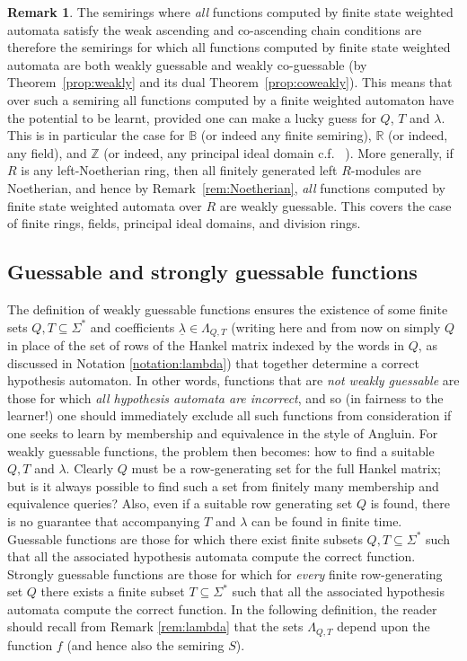 \documentclass[10pt,a4paper]{amsart}
\theoremstyle{definition}
\newtheorem{rem}[thm]{Remark}
\numberwithin{equation}{section}
\numberwithin{theorem}{section}
\begin{document}
\begin{rem}
\label{rem:fields2}
The semirings where \emph{all} functions computed by finite state weighted automata satisfy the weak ascending and co-ascending chain conditions are therefore the semirings for which all functions computed by finite state weighted automata are both weakly guessable and weakly co-guessable (by Theorem~\ref{prop:weakly} and its dual Theorem~\ref{prop:coweakly}). This means that over such a semiring all functions computed by a finite weighted automaton  have the potential to be learnt, provided one can make a lucky guess for $Q$, $T$ and $\lambda$. This is in particular the case for $\mathbb{B}$ (or indeed any finite semiring), $\mathbb{R}$ (or indeed, any field), and $\mathbb{Z}$  (or indeed, any principal ideal domain c.f. ~\cite{HKRS20}). More generally, if $R$ is any left-Noetherian ring, then all finitely generated left $R$-modules are Noetherian, and hence by Remark~\ref{rem:Noetherian}, \emph{all} functions computed by finite state weighted automata over $R$ are weakly guessable. This covers the case of finite rings, fields, principal ideal domains, and division rings.
\end{rem}


\subsection{Guessable and strongly guessable functions}

The definition of weakly guessable functions ensures the existence of some finite sets $Q,T \subseteq \Sigma^*$ and coefficients $\underline{\lambda} \in \Lambda_{Q,T}$ (writing here and from now on simply $Q$ in place of the set of rows of the Hankel matrix indexed by the words in $Q$, as discussed in Notation \ref{notation:lambda}) that together determine a correct hypothesis automaton. In other words, functions that are \emph{not weakly guessable} are those for which \emph{all hypothesis automata are incorrect}, and so (in fairness to the learner!) one should immediately exclude all such functions from consideration if one seeks to learn by membership and equivalence in the style of Angluin. For weakly guessable functions, the problem then becomes: how to find a suitable $Q, T$ and $\lambda$. Clearly $Q$ must be a row-generating set for the full Hankel matrix; but is it always possible to find such a set from finitely many membership and equivalence queries? Also, even if a suitable row generating set $Q$ is found, there is no guarantee that accompanying $T$ and $\lambda$ can be found in finite time. Guessable functions are those for which there exist finite subsets $Q, T \subseteq \Sigma^*$ such that all the associated hypothesis automata compute the correct function. Strongly guessable functions are those for which for \emph{every} finite row-generating set $Q$ there exists a finite subset $T \subseteq \Sigma^*$ such that all the associated hypothesis automata compute the correct function. In the following definition, the reader should recall from Remark \ref{rem:lambda} that the sets $\Lambda_{Q, T}$ depend upon the function $f$ (and hence also the semiring $S$).
\end{document}
